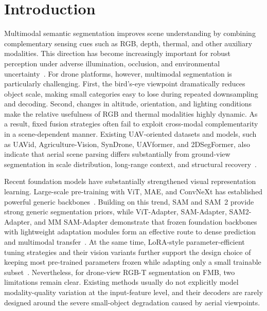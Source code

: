 \section{Introduction}

Multimodal semantic segmentation improves scene understanding by combining complementary sensing cues such as RGB, depth, thermal, and other auxiliary modalities. This direction has become increasingly important for robust perception under adverse illumination, occlusion, and environmental uncertainty~\cite{zhang2021multimodalsurvey,hazirbas2016fusenet,zhang2023cmx}. For drone platforms, however, multimodal segmentation is particularly challenging. First, the bird's-eye viewpoint dramatically reduces object scale, making small categories easy to lose during repeated downsampling and decoding. Second, changes in altitude, orientation, and lighting conditions make the relative usefulness of RGB and thermal modalities highly dynamic. As a result, fixed fusion strategies often fail to exploit cross-modal complementarity in a scene-dependent manner. Existing UAV-oriented datasets and models, such as UAVid, Agriculture-Vision, SynDrone, UAVformer, and 2DSegFormer, also indicate that aerial scene parsing differs substantially from ground-view segmentation in scale distribution, long-range context, and structural recovery~\cite{lyu2020uavid,chiu2020agriculturevision,rizzoli2023syndrone,zhang2023uavformer,li2022twodsegformer}.

Recent foundation models have substantially strengthened visual representation learning. Large-scale pre-training with ViT, MAE, and ConvNeXt has established powerful generic backbones~\cite{dosovitskiy2021vit,he2022mae,liu2022convnext}. Building on this trend, SAM and SAM~2 provide strong generic segmentation priors, while ViT-Adapter, SAM-Adapter, SAM2-Adapter, and MM SAM-Adapter demonstrate that frozen foundation backbones with lightweight adaptation modules form an effective route to dense prediction and multimodal transfer~\cite{kirillov2023segmentanything,ravi2025sam2,chen2023vitadapter,chen2023samadapter,chen2024sam2adapter,curti2025mmsamadapter}. At the same time, LoRA-style parameter-efficient tuning strategies and their vision variants further support the design choice of keeping most pre-trained parameters frozen while adapting only a small trainable subset~\cite{hu2022lora,zhong2024convlora,xin2024peftsurvey}. Nevertheless, for drone-view RGB-T segmentation on FMB, two limitations remain clear. Existing methods usually do not explicitly model modality-quality variation at the input-feature level, and their decoders are rarely designed around the severe small-object degradation caused by aerial viewpoints.

